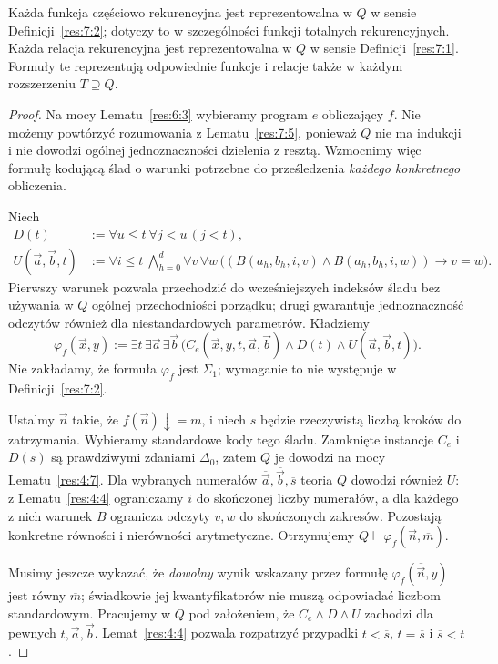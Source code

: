 \begin{twierdzenie}\label{res:7:6}
Każda funkcja częściowo rekurencyjna jest reprezentowalna w $Q$ w sensie Definicji~\ref{res:7:2}; dotyczy to w szczególności funkcji totalnych rekurencyjnych. Każda relacja rekurencyjna jest reprezentowalna w $Q$ w sensie Definicji~\ref{res:7:1}. Formuły te reprezentują odpowiednie funkcje i relacje także w każdym rozszerzeniu $T\supseteq Q$.
\end{twierdzenie}
\begin{proof}
Na mocy Lematu~\ref{res:6:3} wybieramy program $e$ obliczający $f$. Nie możemy powtórzyć rozumowania z Lematu~\ref{res:7:5}, ponieważ $Q$ nie ma indukcji i nie dowodzi ogólnej jednoznaczności dzielenia z resztą. Wzmocnimy więc formułę kodującą ślad o warunki potrzebne do prześledzenia \emph{każdego konkretnego} obliczenia.

Niech
\begin{align*}
D(t)&:=\forall u\le t\ \forall j<u\,(j<t),\\
U(\vec a,\vec b,t)&:=\forall i\le t\ \bigwedge_{h=0}^d\forall v\,\forall w\,
\bigl((B(a_h,b_h,i,v)\land B(a_h,b_h,i,w))\to v=w\bigr).
\end{align*}
Pierwszy warunek pozwala przechodzić do wcześniejszych indeksów śladu bez używania w $Q$ ogólnej przechodniości porządku; drugi gwarantuje jednoznaczność odczytów również dla niestandardowych parametrów. Kładziemy
\[
\varphi_f(\vec x,y):=\exists t\,\exists\vec a\,\exists\vec b\,
\bigl(C_e(\vec x,y,t,\vec a,\vec b)\land D(t)\land U(\vec a,\vec b,t)\bigr).
\]
Nie zakładamy, że formuła $\varphi_f$ jest $\Sigma_1$; wymaganie to nie występuje w Definicji~\ref{res:7:2}.

Ustalmy $\vec n$ takie, że $f(\vec n)\downarrow=m$, i niech $s$ będzie rzeczywistą liczbą kroków do zatrzymania. Wybieramy standardowe kody tego śladu. Zamknięte instancje $C_e$ i $D(\overline s)$ są prawdziwymi zdaniami $\Delta_0$, zatem $Q$ je dowodzi na mocy Lematu~\ref{res:4:7}. Dla wybranych numerałów $\overline{\vec a},\overline{\vec b},\overline s$ teoria $Q$ dowodzi również $U$: z Lematu~\ref{res:4:4} ograniczamy $i$ do skończonej liczby numerałów, a dla każdego z nich warunek $B$ ogranicza odczyty $v,w$ do skończonych zakresów. Pozostają konkretne równości i nierówności arytmetyczne. Otrzymujemy
$Q\vdash\varphi_f(\overline{\vec n},\overline m)$.

Musimy jeszcze wykazać, że \emph{dowolny} wynik wskazany przez formułę $\varphi_f(\overline{\vec n},y)$ jest równy $\overline m$; świadkowie jej kwantyfikatorów nie muszą odpowiadać liczbom standardowym. Pracujemy w $Q$ pod założeniem, że $C_e\land D\land U$ zachodzi dla pewnych $t,\vec a,\vec b$. Lemat~\ref{res:4:4} pozwala rozpatrzyć przypadki $t<\overline s$, $t=\overline s$ i $\overline s<t$.


\end{proof}

